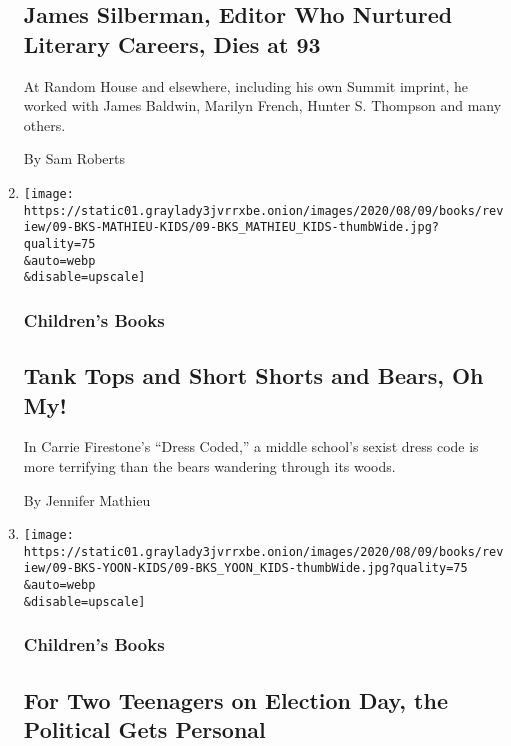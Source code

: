 \begin{enumerate}
{  \subsection{James Silberman, Editor Who Nurtured Literary Careers,
  Dies at
  93}\label{james-silberman-editor-who-nurtured-literary-careers-dies-at-93}}

  At Random House and elsewhere, including his own Summit imprint, he
  worked with James Baldwin, Marilyn French, Hunter S. Thompson and many
  others.

  By Sam Roberts
\item
  \href{/2020/08/01/books/review/carrie-firestone-dress-coded.html}{}

  \texttt{[image: https://static01.graylady3jvrrxbe.onion/images/2020/08/09/books/review/09-BKS-MATHIEU-KIDS/09-BKS\_MATHIEU\_KIDS-thumbWide.jpg?quality=75\\\&auto=webp\\\&disable=upscale]}

  \hypertarget{childrens-books}{%
  \subsubsection{Children's Books}\label{childrens-books}}

  \hypertarget{tank-tops-and-short-shorts-and-bears-oh-my}{%
  \subsection{Tank Tops and Short Shorts and Bears, Oh
  My!}\label{tank-tops-and-short-shorts-and-bears-oh-my}}

  In Carrie Firestone's ``Dress Coded,'' a middle school's sexist dress
  code is more terrifying than the bears wandering through its woods.

  By Jennifer Mathieu
\item
  \href{/2020/08/01/books/review/brandy-colbert-the-voting-booth.html}{}

  \texttt{[image: https://static01.graylady3jvrrxbe.onion/images/2020/08/09/books/review/09-BKS-YOON-KIDS/09-BKS\_YOON\_KIDS-thumbWide.jpg?quality=75\\\&auto=webp\\\&disable=upscale]}

  \hypertarget{childrens-books-1}{%
  \subsubsection{Children's Books}\label{childrens-books-1}}

  \hypertarget{for-two-teenagers-on-election-day-the-political-gets-personal}{%
  \subsection{For Two Teenagers on Election Day, the Political Gets
  Personal}\label{for-two-teenagers-on-election-day-the-political-gets-personal}}


\end{enumerate}
